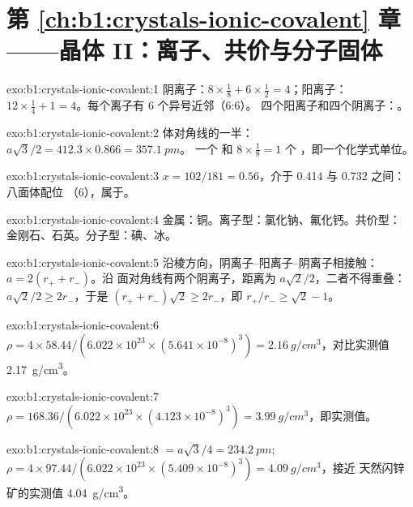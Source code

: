 \section*{第 \ref{ch:b1:crystals-ionic-covalent} 章——晶体 II：离子、共价与分子固体}

\begin{solution}{exo:b1:crystals-ionic-covalent:1}
阴离子：$8 \times \frac18 + 6 \times \frac12 = 4$；阳离子：$12 \times
\frac14 + 1 = 4$。每个离子有 6 个异号近邻（6:6）。
四个阳离子和四个阴离子：。
\end{solution}

\begin{solution}{exo:b1:crystals-ionic-covalent:2}
体对角线的一半：$a\sqrt3/2 = 412.3 \times 0.866 = \qty{357.1}{pm}$。
一个  和 $8 \times \frac18 = 1$ 个 ，即一个化学式单位。
\end{solution}

\begin{solution}{exo:b1:crystals-ionic-covalent:3}
$x = 102/181 = 0.56$，介于 0.414 与 0.732 之间：八面体配位
（6），属于。
\end{solution}

\begin{solution}{exo:b1:crystals-ionic-covalent:4}
金属：铜。离子型：氯化钠、氟化钙。共价型：
金刚石、石英。分子型：碘、冰。
\end{solution}

\begin{solution}{exo:b1:crystals-ionic-covalent:5}
沿棱方向，阴离子–阳离子–阴离子相接触：$a = 2(r_+ + r_-)$。沿
面对角线有两个阴离子，距离为 $a\sqrt2/2$，二者不得重叠：
$a\sqrt2/2 \ge 2r_-$，于是 $(r_+ + r_-)\sqrt2 \ge 2r_-$，即
$r_+/r_- \ge \sqrt2 - 1$。
\end{solution}

\begin{solution}{exo:b1:crystals-ionic-covalent:6}
$\rho = 4 \times 58.44/(6.022 \times 10^{23} \times (5.641 \times
10^{-8})^3) = \qty{2.16}{g/cm^3}$，对比实测值 \qty{2.17}{g/cm^3}。
\end{solution}

\begin{solution}{exo:b1:crystals-ionic-covalent:7}
$\rho = 168.36/(6.022 \times 10^{23} \times (4.123 \times 10^{-8})^3) =
\qty{3.99}{g/cm^3}$，即实测值。
\end{solution}

\begin{solution}{exo:b1:crystals-ionic-covalent:8}
 $= a\sqrt3/4 = \qty{234.2}{pm}$;
$\rho = 4 \times 97.44/(6.022 \times 10^{23} \times (5.409 \times
10^{-8})^3) = \qty{4.09}{g/cm^3}$，接近
天然闪锌矿的实测值 \qty{4.04}{g/cm^3}。
\end{solution}

